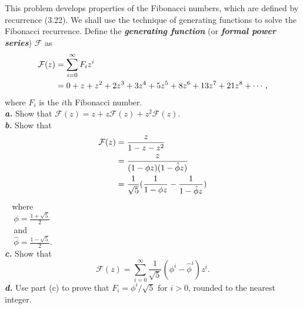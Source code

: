 \documentclass[12pt, a4paper, UTF8]{ctexart}
\begin{document}
\begin{problem}[TC: problem 4.4]
  This problem develops properties of the Fibonacci numbers, which are defined 
  by recurrence (3.22). We shall use the technique of generating functions to 
  solve the Fibonacci recurrence. Define the \textbf{\textsl{generating function}} 
  (or \textbf{\textsl{formal power series}}) $\mathcal{F}$ as
  \begin{align}
      \mathcal{F}(z) & = \sum_{i = 0}^{\infty} F_{i}z^{i} \notag \\
                     & = 0 + z + z^{2} + 2z^{3} + 3z^{4} + 5z^{5} + 8z^{6} 
                     + 13z^{7} + 21z^{8} + \cdots, \notag
  \end{align}
  where $F_{i}$ is the $i$th Fibonacci number.\\
  \textsl{\textbf{a.}} Show that $\mathcal{F}(z) = z + z\mathcal{F}(z) + z^{2}\mathcal{F}(z).$\\
  \textsl{\textbf{b.}} Show that
  \begin{align}
      \mathcal{F}(z) & = \frac{z}{1 - z - z^{2}} \notag \\
                     & = \frac{z}{(1 - \phi z)(1 - \hat{\phi}z)} \notag \\
                     & = \frac{1}{\sqrt{5}}(\frac{1}{1 - \phi z} - \frac{1}{1 - \hat{\phi}z}) \notag
  \end{align}
  $~~~~$where\\
  $~~~~~\phi = \frac{1 + \sqrt{5}}{2}$\\
  $~~~~~$and\\
  $~~~~~\hat{\phi} = \frac{1 - \sqrt{5}}{2}.$\\
  \textsl{\textbf{c.}} Show that
  \[ \mathcal{F}(z) = \sum_{i = 0}^{\infty} \frac{1}{\sqrt{5}}(\phi^{i} - \hat{\phi}^{i})z^{i}. \]
  \textsl{\textbf{d.}} Use part (c) to prove that $F_{i} = \phi^{i} / \sqrt{5}$ 
  for $i > 0$, rounded to the nearest integer. 
\end{problem}
\end{document}
